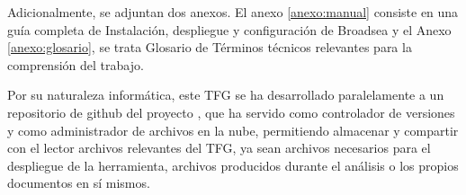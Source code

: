 Adicionalmente, se adjuntan dos anexos. El anexo \ref{anexo:manual} consiste en una guía completa de Instalación, despliegue y configuración de Broadsea y el Anexo \ref{anexo:glosario}, se trata Glosario de Términos técnicos relevantes para la comprensión del trabajo. 

Por su naturaleza informática, este TFG se ha desarrollado paralelamente a un repositorio de github del proyecto \cite{vallealonsodc}, que ha servido como controlador de versiones y como administrador de archivos en la nube, permitiendo almacenar y compartir con el lector archivos relevantes del TFG, ya sean archivos necesarios para el despliegue de la herramienta, archivos producidos durante el análisis o los propios documentos en sí mismos.
